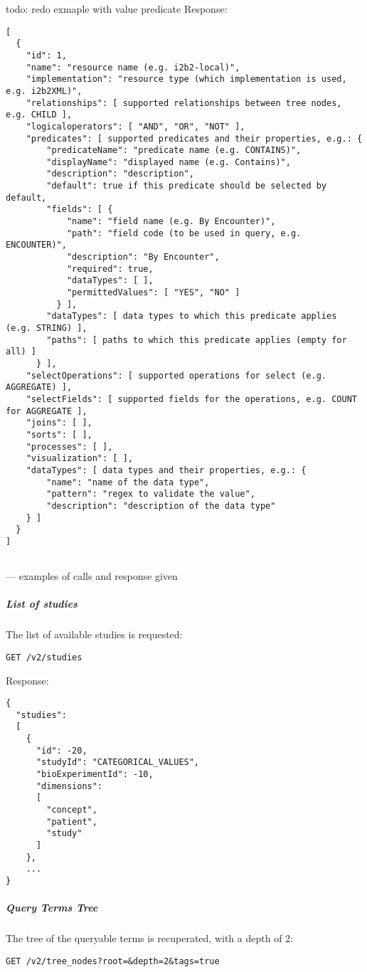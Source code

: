 todo: redo exmaple with value predicate 
Response:
\begin{verbatim}
[
  {
    "id": 1,
    "name": "resource name (e.g. i2b2-local)",
    "implementation": "resource type (which implementation is used, e.g. i2b2XML)",
    "relationships": [ supported relationships between tree nodes, e.g. CHILD ],
    "logicaloperators": [ "AND", "OR", "NOT" ],
    "predicates": [ supported predicates and their properties, e.g.: {
        "predicateName": "predicate name (e.g. CONTAINS)",
        "displayName": "displayed name (e.g. Contains)",
        "description": "description",
        "default": true if this predicate should be selected by default,
        "fields": [ {
            "name": "field name (e.g. By Encounter)",
            "path": "field code (to be used in query, e.g. ENCOUNTER)",
            "description": "By Encounter",
            "required": true,
            "dataTypes": [ ],
            "permittedValues": [ "YES", "NO" ]
          } ],
        "dataTypes": [ data types to which this predicate applies (e.g. STRING) ],
        "paths": [ paths to which this predicate applies (empty for all) ]
      } ],
    "selectOperations": [ supported operations for select (e.g. AGGREGATE) ],
    "selectFields": [ supported fields for the operations, e.g. COUNT for AGGREGATE ],
    "joins": [ ],
    "sorts": [ ],
    "processes": [ ],
    "visualization": [ ],
    "dataTypes": [ data types and their properties, e.g.: {
        "name": "name of the data type",
        "pattern": "regex to validate the value",
        "description": "description of the data type"
    } ]
  }
]
    
\end{verbatim}


---
examples of calls and response given

\subparagraph{List of studies}
The list of available studies is requested:
\begin{verbatim}
GET /v2/studies
\end{verbatim}

Response:
\begin{verbatim}
{
  "studies": 
  [
    {
      "id": -20,
      "studyId": "CATEGORICAL_VALUES",
      "bioExperimentId": -10,
      "dimensions": 
      [
        "concept",
        "patient",
        "study"
      ]
    },
    ...
}
\end{verbatim}

\subparagraph{Query Terms Tree}
The tree of the queryable terms is recuperated, with a depth of 2:
\begin{verbatim}
GET /v2/tree_nodes?root=&depth=2&tags=true
\end{verbatim}

